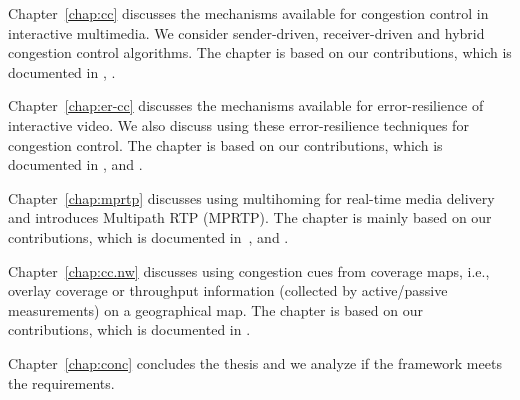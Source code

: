 
Chapter~\ref{chap:cc} discusses the mechanisms available for congestion
control in interactive multimedia. We consider sender-driven, receiver-driven
and hybrid congestion control algorithms. The chapter is based on our
contributions, which is documented in , .


Chapter~\ref{chap:er-cc} discusses the mechanisms available for error-resilience of
interactive video. We also discuss using these error-resilience techniques for
congestion control. The chapter is based on our contributions, which is
documented in , and .



Chapter~\ref{chap:mprtp} discusses using multihoming for real-time media delivery
and introduces Multipath RTP (MPRTP). The chapter is mainly based on our
contributions, which is documented in~\cite{draft.mprtp, draft.mprtp.sdp,
Globisch:AsymGrpComm, draft.rtcp.overlay}, and .


Chapter~\ref{chap:cc.nw} discusses using congestion cues from coverage maps, i.e.,
overlay coverage or throughput information (collected by active/passive
measurements) on a geographical map. The chapter is based on our
contributions,  which is documented in .


Chapter~\ref{chap:conc} concludes the thesis and we analyze if the framework meets
the requirements.
